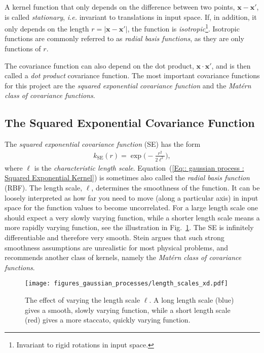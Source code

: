 \documentclass[twoside,english]{uiofysmaster}
\begin{document}
{A kernel function that only depends on the difference between two points, $\textbf{x}-\textbf{x}'$, is called \textit{stationary}, \textit{i.e.} invariant to translations in input space. If, in addition, it only depends on the length $r=|\textbf{x}-\textbf{x}'|$, the function is \textit{isotropic}\footnote{Invariant to rigid rotations in input space.}.  Isotropic functions are commonly referred to as \textit{radial basis functions}, as they are only functions of $r$. 

The covariance function can also depend on the dot product, $\textbf{x} \cdot \textbf{x}'$, and is then called a \textit{dot product} covariance function. The most important covariance functions for this project are the \textit{squared exponential covariance function} and the \textit{Mat\'{e}rn class of covariance functions}.




\subsection{The Squared Exponential Covariance Function}

The \textit{squared exponential covariance function} (SE) has the form 
\begin{align}\label{Eq:: gaussian process : Squared Exponential Kernel}
k_{\mathrm{SE}} (r) = \exp \Big( - \frac{r^2}{2 \ell^2} \Big),
\end{align} 
where $\ell$ is the \textit{characteristic length scale}. Equation~(\ref{Eq:: gaussian process : Squared Exponential Kernel}) is sometimes also called the \textit{radial basis function} (RBF). The length scale, $\ell$, determines the smoothness of the function. It can be loosely interpreted as how far you need to move (along a particular axis) in input space for the function values to become uncorrelated. For a large length scale one should expect a very slowly varying function, while a shorter length scale means a more rapidly varying function, see the illustration in Fig.~\ref{Fig:: gaussian process : ell variation example}. The SE is infinitely differentiable and therefore very smooth. Stein \cite{steininterpolation} argues that such strong smoothness assumptions are unrealistic for most physical problems, and recommends another class of kernels, namely the \textit{Mat\'{e}rn class of covariance functions}.

\begin{figure}
\centering
\texttt{[image: figures\_gaussian\_processes/length\_scales\_xd.pdf]}
\caption{The effect of varying the length scale $\ell$. A long length scale (blue) gives a smooth, slowly varying function, while a short length scale (red) gives a more staccato, quickly varying function.}
\label{Fig:: gaussian process : ell variation example}
\end{figure}

}
\end{document}
